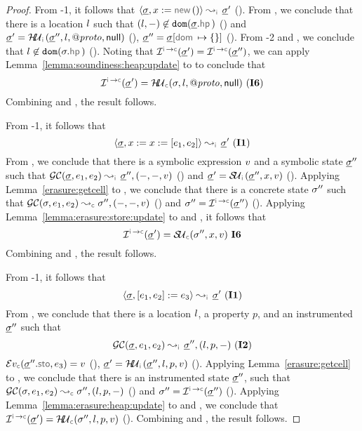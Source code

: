 \begin{proof}
 \noindent {} From \hyp{1}, it follows that $\absbsemrule{\istate, \jvar := \jsilnew()}{\istate'}{\instrumented}$ (). 
From , we conclude that there is a location $l$ such that $(\loc, -) \not\in \domain(\istate.\hpsel)$ () and 
$\istate' = \hpupdt{\instrumented}(\istate'', \loc, \protop, \jnull)$ (), 
$\istate'' = \istate[\domsel \mapsto \{ \}]$ (). 
From \hyp{2} and , we conclude that $\loc \not\in \domain(\jstate.\hpsel)$ (). 
Noting that $\interpret{\instconc}{}(\istate') = \interpret{\instconc}{}(\istate'')$, 
we can apply Lemma~\ref{lemma:soundiness:heap:update} to  to conclude that 
$$\interpret{\instconc}{}(\istate') = \hpupdt{\concrete}(\jstate, \loc, \protop, \jnull) \text{ (\ieq{6})}$$ 
Combining  and , the result follows. 
\vspace{5pt}

\noindent {} From \hyp{1}, it follows that 
$$\absbsemrule{\istate, \jvar := \jvar := [\jsilexpr_1, \jsilexpr_2]}{\istate'}{\instrumented} \text{ (\ieq{1})}$$
From , we conclude that there is a symbolic expression $v$ and a symbolic state $\underline{\sigma}''$ such that 
$\absgetcellrule{\instrumented}{\istate, \jsilexpr_1, \jsilexpr_2}{\istate'', (-, -, \val)}$ () 
and $\istate' = \stupdt{\instrumented}(\istate'', \jvar, \val)$ (). 
Applying Lemma~\ref{erasure:getcell} to , we conclude that 
there is a concrete state $\sigma''$ such that  
$\absgetcellrule{\concrete}{\jstate, \jsilexpr_1, \jsilexpr_2}{\jstate'', (-, -, \val)}$ ()
and $\jstate'' = \interpret{\instconc}{}(\istate'')$ (). 
Applying Lemma~\ref{lemma:erasure:store:update} to  and , 
it follows that 
$$
\interpret{\instconc}{}(\istate') = \stupdt{\concrete}(\jstate'', \jvar, \val) \text{ \ieq{6}}
$$
Combining  and , the result follows. 
\vspace{5pt}

\noindent {}
From \hyp{1}, it follows that 
$$\absbsemrule{\istate, [\jsilexpr_1, \jsilexpr_2] := \jsilexpr_3}{\istate'}{\instrumented} \text{ (\ieq{1})}$$
From , we conclude that there is a location $l$, a property $p$, and an instrumented $\underline{\sigma}''$ such that 
$$\absgetcellrule{\instrumented}{\istate, \jsilexpr_1, \jsilexpr_2}{\istate'', (\loc, p, -)} \text{ (\ieq{2})}$$
$\evalexpr{\concrete}(\istate''.\stosel, \jsilexpr_3) = \val$ (),  
$\istate' = \hpupdt{\instrumented}(\istate'', \loc, p, \val)$ (). 
%
Applying Lemma~\ref{erasure:getcell} to , we conclude that
there is an instrumented state $\underline{\sigma}''$, such that 
$\absgetcellrule{\concrete}{\jstate, \jsilexpr_1, \jsilexpr_2}{\jstate'', (\loc, p, -)}$ () 
and $\jstate'' = \interpret{\instconc}{}(\istate'')$ (). 
%
Applying Lemma~\ref{lemma:erasure:heap:update} to  and , we conclude that 
$\interpret{\instconc}{}(\istate') = \hpupdt{\concrete}(\jstate'', \loc, p, \val)$ ().
%
Combining  and , the result follows. 
\vspace{5pt}



\end{proof}
